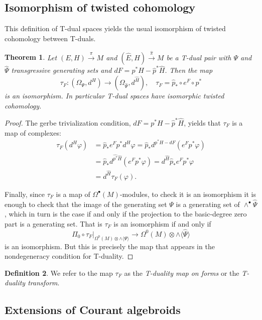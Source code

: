 \documentclass[12pt,twoside]{article}
\theoremstyle{plain}
\newtheorem{theorem}{Theorem}[section]
\theoremstyle{definition}
\newtheorem{definition}[theorem]{Definition}
\newcommand{\gf}{\text{$\varphi$}}
\newcommand{\tensor}{\otimes}
\newcommand{\IP}[1]{\langle #1 \rangle}
\numberwithin{equation}{section}
\begin{document}
\subsection{Isomorphism of twisted cohomology}

This definition of T-dual spaces yields the usual isomorphism of twisted cohomology between T-duals.

\begin{theorem}\label{theo:iso1}
Let $(E,H)\stackrel{\pi}{\longrightarrow} M$ and $(\hat{E},\hat{H})\stackrel{\hat\pi}{\longrightarrow} M$ be a T-dual pair with $\Psi$ and $\hat{\Psi}$ transgressive generating sets and $dF =p^*H - \hat{p}^*\hat{H}$.  Then the map
\[\tau_F\colon (\Omega_{\Psi},d^H) \to (\Omega_{\hat{\Psi}},d^{\hat{H}}),\quad  \tau_F = \hat{p}_*\circ e^F\circ p^* \]
is an isomorphism. In particular T-dual spaces have isomorphic twisted cohomology.
\end{theorem}
\begin{proof}
The gerbe trivialization condition, $dF = p^*H - \hat{p}^*\hat{H}$, yields that $\tau_F$ is a map of complexes:
\begin{align*}
\tau_{F}(d^H\gf) &= \hat{p}_*e^F p^* d^{H}\gf = \hat{p}_*d^{p^*H- dF}(e^F p^*\gf)\\
& =   \hat{p}_*d^{\hat{p^*}\hat{H}}(e^F p^*\gf) = d^{\hat{H}}\hat{p}_*e^F p^*\gf\\
&= d^{\hat{H}}\tau_F(\gf).
\end{align*}

Finally, since $\tau_F$ is a map of $\Omega^\bullet(M)$-modules, to check it is an isomorphism it is enough to check that the image of the generating set $\Psi$ is a generating set of $\wedge^\bullet \hat{\Psi}$, which in turn is the case if and only if the projection to the basic-degree zero part is a generating set. That is $\tau_F$ is an isomorphism if and only if
\[\Pi_0 \circ \tau_F|_{\Omega^0(M)\tensor \wedge\IP{\Psi}} \to \Omega^0(M)\tensor \wedge\IP{\hat\Psi}\]
is an isomorphism. But this is precisely the map that appears in the nondegeneracy condition for T-duality. 
\end{proof}

\begin{definition}
We refer to the map $\tau_F$ as the \emph{T-duality map on forms} or the \emph{T-duality transform}. 
\end{definition}
 
\subsection{Extensions of Courant algebroids}
\end{document}
